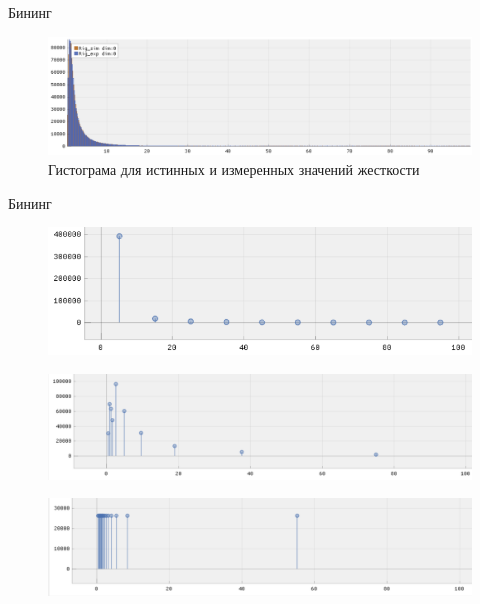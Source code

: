 \documentclass[fullscreen=true,russian,compress,%
	hyperref={unicode,bookmarks=false}]{presentation}
\begin{document}
\begin{frame}{Бининг}
   \begin{figure}[h!]
      \centering
      \includegraphics[width=\linewidth]{images/rig_dist.png}
      \caption{Гистограма для истинных и измеренных значений жесткости}
      \label{photo:rig_dist}
   \end{figure}
\end{frame}

\begin{frame}{Бининг}
   \begin{figure}[h!]
      \centering
      \includegraphics[scale=0.55]{images/rig_static_binning.png}
      \label{fig:coffee}
   \end{figure}
   \begin{figure}[h!]
      \centering
      \includegraphics[scale=0.37]{images/rig_dynamic_binning.png}
    \end{figure}

    \begin{figure}[h!]
      \centering
      \includegraphics[scale=0.37]{images/rig_median_binning.png}
    \end{figure}
\end{frame}
\end{document}
